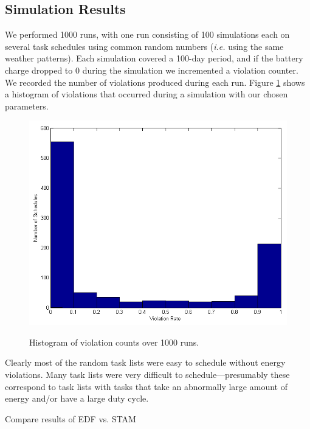 \subsection{Simulation Results}
We performed 1000 runs, with one run consisting of 100 simulations each on several task schedules using common random numbers (\emph{i.e.} using the same weather patterns).  Each simulation covered a 100-day period, and if the battery charge dropped to 0 during the simulation we incremented a violation counter.  We recorded the number of violations produced during each run.  Figure \ref{fig:violationhist} shows a histogram of violations that occurred during a simulation with our chosen parameters.
\begin{figure}[h]
\includegraphics[scale=0.5]{violationhistogram.png}
\label{fig:violationhist}
\caption{Histogram of violation counts over 1000 runs.}
\end{figure}
Clearly most of the random task lists were easy to schedule without energy violations.  Many task lists were very difficult to schedule---presumably these correspond to task lists with tasks that take an abnormally large amount of energy and/or have a large duty cycle.

Compare results of EDF vs. STAM































